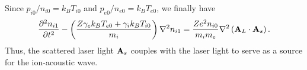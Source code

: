 \documentclass[a4paper,11pt]{report}
\begin{document}
Since $p_{i0}/n_{i0} = k_B T_{i0}$ and $p_{e0} / n_{e0} = k_B T_{e0}$, we finally have
\begin{equation}
    \frac{\partial^2 n_{i1}}{\partial t^2} - \left ( \frac{Z \gamma_e k_B T_{e0} + \gamma_i k_B T_{i0}}{m_i} \right ) \nabla^2 n_{i1} = \frac{Z e^2 n_{i0}}{m_i m_e} \nabla^2 \left (\mathbf{A}_L \cdot \mathbf{A}_s \right ).
\end{equation}
Thus, the scattered laser light $\mathbf{A}_s$ couples with the laser light to serve as a source for the ion-acoustic wave.




\end{document}
